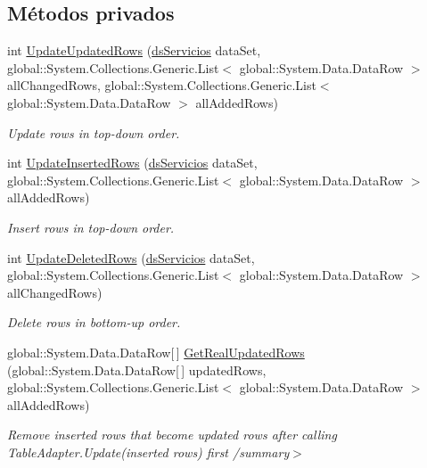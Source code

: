 \subsection*{Métodos privados}
\begin{DoxyCompactItemize}
\item 
int \hyperlink{class_proyecto___integrador__3_1_1ds_servicios_table_adapters_1_1_table_adapter_manager_a800bbbaf23f900584fa0b95d8c3b171b}{Update\-Updated\-Rows} (\hyperlink{class_proyecto___integrador__3_1_1ds_servicios}{ds\-Servicios} data\-Set, global\-::\-System.\-Collections.\-Generic.\-List$<$ global\-::\-System.\-Data.\-Data\-Row $>$ all\-Changed\-Rows, global\-::\-System.\-Collections.\-Generic.\-List$<$ global\-::\-System.\-Data.\-Data\-Row $>$ all\-Added\-Rows)
\begin{DoxyCompactList}\small\item\em Update rows in top-\/down order. \end{DoxyCompactList}\item 
int \hyperlink{class_proyecto___integrador__3_1_1ds_servicios_table_adapters_1_1_table_adapter_manager_afd9bc5851d98a4a12ce07dce45912685}{Update\-Inserted\-Rows} (\hyperlink{class_proyecto___integrador__3_1_1ds_servicios}{ds\-Servicios} data\-Set, global\-::\-System.\-Collections.\-Generic.\-List$<$ global\-::\-System.\-Data.\-Data\-Row $>$ all\-Added\-Rows)
\begin{DoxyCompactList}\small\item\em Insert rows in top-\/down order. \end{DoxyCompactList}\item 
int \hyperlink{class_proyecto___integrador__3_1_1ds_servicios_table_adapters_1_1_table_adapter_manager_a804886cac0d2de3f6c24b4b36f70a2bf}{Update\-Deleted\-Rows} (\hyperlink{class_proyecto___integrador__3_1_1ds_servicios}{ds\-Servicios} data\-Set, global\-::\-System.\-Collections.\-Generic.\-List$<$ global\-::\-System.\-Data.\-Data\-Row $>$ all\-Changed\-Rows)
\begin{DoxyCompactList}\small\item\em Delete rows in bottom-\/up order. \end{DoxyCompactList}\item 
global\-::\-System.\-Data.\-Data\-Row\mbox{[}$\,$\mbox{]} \hyperlink{class_proyecto___integrador__3_1_1ds_servicios_table_adapters_1_1_table_adapter_manager_a32c8e4d34a932fd8b581e954c7e50376}{Get\-Real\-Updated\-Rows} (global\-::\-System.\-Data.\-Data\-Row\mbox{[}$\,$\mbox{]} updated\-Rows, global\-::\-System.\-Collections.\-Generic.\-List$<$ global\-::\-System.\-Data.\-Data\-Row $>$ all\-Added\-Rows)
\begin{DoxyCompactList}\small\item\em Remove inserted rows that become updated rows after calling Table\-Adapter.\-Update(inserted rows) first /summary$>$ \end{DoxyCompactList}\end{DoxyCompactItemize}
